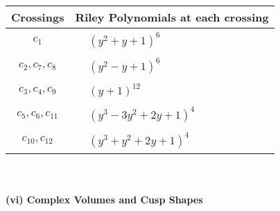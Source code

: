 \documentclass[1p]{elsarticle_modified}
\theoremstyle{definition}
\begin{document}
\begin{tabular}{m{50pt}|m{274pt}}
Crossings & \hspace{64pt}Riley Polynomials at each crossing \\
\hline $$\begin{aligned}c_{1}\end{aligned}$$&$\begin{aligned}
&(y^2+y+1)^6
\end{aligned}$\\
\hline $$\begin{aligned}c_{2},c_{7},c_{8}\end{aligned}$$&$\begin{aligned}
&(y^2- y+1)^6
\end{aligned}$\\
\hline $$\begin{aligned}c_{3},c_{4},c_{9}\end{aligned}$$&$\begin{aligned}
&(y+1)^{12}
\end{aligned}$\\
\hline $$\begin{aligned}c_{5},c_{6},c_{11}\end{aligned}$$&$\begin{aligned}
&(y^3-3 y^2+2 y+1)^4
\end{aligned}$\\
\hline $$\begin{aligned}c_{10},c_{12}\end{aligned}$$&$\begin{aligned}
&(y^3+y^2+2 y+1)^4
\end{aligned}$\\
\hline
\end{tabular}\\~\\
\newpage\flushleft \textbf{(vi) Complex Volumes and Cusp Shapes}
\end{document}
